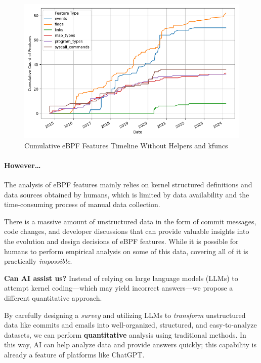 \begin{figure}[ht]
    \centering
    \includegraphics[width=\linewidth]{feature-analysis/cumulative_bpf_features_timeline_no_helper_kfunc.png}
    \caption{Cumulative eBPF Features Timeline Without Helpers and kfuncs}
    \label{fig:cumulative_without_helper_timeline}
\end{figure}

\paragraph{However\ldots}

The analysis of eBPF features mainly relies on kernel structured definitions and data sources obtained by humans, which is limited by data availability and the time-consuming process of manual data collection.

There is a massive amount of unstructured data in the form of commit messages, code changes, and developer discussions that can provide valuable insights into the evolution and design decisions of eBPF features. While it is possible for humans to perform empirical analysis on some of this data, covering all of it is practically \emph{impossible}.

\textbf{Can AI assist us?} Instead of relying on large language models (LLMs) to attempt kernel coding—which may yield incorrect answers—we propose a different quantitative approach.

By carefully designing a \emph{survey} and utilizing LLMs to \emph{transform} unstructured data like commits and emails into well-organized, structured, and easy-to-analyze datasets, we can perform \textbf{quantitative} analysis using traditional methods. In this way, AI can help analyze data and provide answers quickly; this capability is already a feature of platforms like ChatGPT.